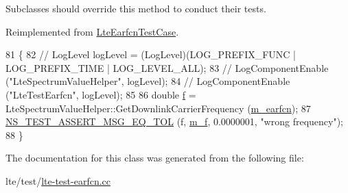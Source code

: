 Subclasses should override this method to conduct their tests. 

Reimplemented from \hyperlink{classLteEarfcnTestCase_a36386da997b4f57ab0fd57ae5c44d73f}{Lte\+Earfcn\+Test\+Case}.


\begin{DoxyCode}
81 \{
82 \textcolor{comment}{//   LogLevel logLevel = (LogLevel)(LOG\_PREFIX\_FUNC | LOG\_PREFIX\_TIME | LOG\_LEVEL\_ALL);}
83 \textcolor{comment}{//   LogComponentEnable ("LteSpectrumValueHelper", logLevel);}
84 \textcolor{comment}{//   LogComponentEnable ("LteTestEarfcn", logLevel);}
85 
86   \textcolor{keywordtype}{double} \hyperlink{buildings__pathloss_8m_aa52d3a6e3de5a80a97c12364caeaa125}{f} = LteSpectrumValueHelper::GetDownlinkCarrierFrequency (\hyperlink{classLteEarfcnTestCase_ab4fea55308ce0ef622597e722b19d005}{m\_earfcn});
87   \hyperlink{group__testing_ga9e7861b56b4e70db3b56044cb7a28e41}{NS\_TEST\_ASSERT\_MSG\_EQ\_TOL} (f, \hyperlink{classLteEarfcnTestCase_a98327c6792af6dd6d3eb5ed3772b0960}{m\_f}, 0.0000001, \textcolor{stringliteral}{"wrong frequency"});
88 \}
\end{DoxyCode}


The documentation for this class was generated from the following file\+:\begin{DoxyCompactItemize}
\item 
lte/test/\hyperlink{lte-test-earfcn_8cc}{lte-\/test-\/earfcn.\+cc}\end{DoxyCompactItemize}
